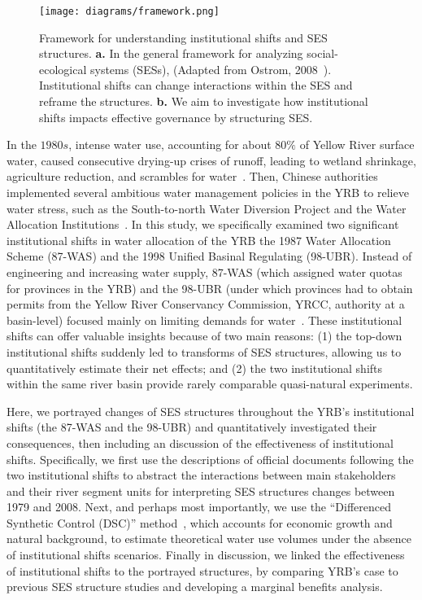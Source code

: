 \begin{figure}[!ht]
	\centering
	\texttt{[image: diagrams/framework.png]}
	\caption{
		Framework for understanding institutional shifts and SES structures. \textbf{a.} In the general framework for analyzing social-ecological systems (SESs), (Adapted from Ostrom, 2008~\cite{ostrom2009}). Institutional shifts can change interactions within the SES and reframe the structures.  \textbf{b.} We aim to investigate how institutional shifts impacts effective governance by structuring SES.}\label{fig:framework}
\end{figure}

In the $1980s$, intense water use, accounting for about $80\%$ of Yellow River surface water, caused consecutive drying-up crises of runoff, leading to wetland shrinkage, agriculture reduction, and scrambles for water~\cite{wohlfart2016}.
Then, Chinese authorities implemented several ambitious water management policies in the YRB to relieve water stress, such as the South-to-north Water Diversion Project and the Water Allocation Institutions~\cite{long2020, wang2019d}.
In this study, we specifically examined two significant institutional shifts in water allocation of the YRB\: the 1987 Water Allocation Scheme (87-WAS) and the 1998 Unified Basinal Regulating (98-UBR).
Instead of engineering and increasing water supply, 87-WAS (which assigned water quotas for provinces in the YRB) and the 98-UBR (under which provinces had to obtain permits from the Yellow River Conservancy Commission, YRCC, authority at a basin-level) focused mainly on limiting demands for water~\cite{bouckaert2022, speed2013}.
These institutional shifts can offer valuable insights because of two main reasons:
(1) the top-down institutional shifts suddenly led to transforms of SES structures, allowing us to quantitatively estimate their net effects; and (2) the two institutional shifts within the same river basin provide rarely comparable quasi-natural experiments.

Here, we portrayed changes of SES structures throughout the YRB's institutional shifts (the 87-WAS and the 98-UBR) and quantitatively investigated their consequences, then including an discussion of the effectiveness of institutional shifts.
Specifically, we first use the descriptions of official documents following the two institutional shifts to abstract the interactions between main stakeholders and their river segment units for interpreting SES structures changes between 1979 and 2008.
Next, and perhaps most importantly, we use the ``Differenced Synthetic Control (DSC)'' method~\cite{arkhangelsky2021}, which accounts for economic growth and natural background, to estimate theoretical water use volumes under the absence of institutional shifts scenarios.
Finally in discussion, we linked the effectiveness of institutional shifts to the portrayed structures, by comparing YRB's case to previous SES structure studies and developing a marginal benefits analysis.
